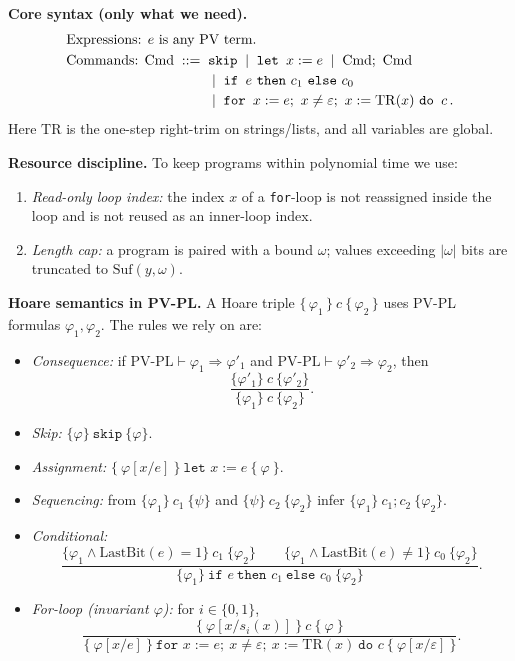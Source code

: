 \medskip
\noindent\textbf{Core syntax (only what we need).}
\[
\begin{array}{l}
\text{Expressions: } e \text{ is any PV term.} \\[0.3em]
\text{Commands: } \text{Cmd} \;::=\; \texttt{skip}
\;\mid\; \texttt{let } x := e
\;\mid\; \text{Cmd};\ \text{Cmd} \\[0.25em]
\hphantom{\text{Commands: } \text{Cmd} \;::=\;} 
\;\mid\; \texttt{if } e \ \texttt{then}\ c_1\ \texttt{else}\ c_0 \\[0.25em]
\hphantom{\text{Commands: } \text{Cmd} \;::=\;}
\;\mid\; \texttt{for } x := e;\ x \neq \varepsilon;\ x := \mathrm{TR}(x)\ \texttt{do } c\,.
\end{array}
\]
Here \( \mathrm{TR} \) is the one-step right-trim on strings/lists, and all variables are global.

\medskip
\noindent\textbf{Resource discipline.}
To keep programs within polynomial time we use:
\begin{enumerate}
  \item \emph{Read-only loop index:} the index \(x\) of a \texttt{for}-loop is not reassigned inside the loop and is not reused as an inner-loop index.
  \item \emph{Length cap:} a program is paired with a bound \(\omega\); values exceeding \(|\omega|\) bits are truncated to \(\mathrm{Suf}(y,\omega)\).
\end{enumerate}

\medskip
\noindent\textbf{Hoare semantics in PV-PL.}
A Hoare triple \(\{\,\varphi_1\,\}\ c\ \{\,\varphi_2\,\}\) uses PV-PL formulas \(\varphi_1,\varphi_2\). The rules we rely on are:

\begin{itemize}
  \item \emph{Consequence:} if \( \mathrm{PV\mbox{-}PL} \vdash \varphi_1 \Rightarrow \varphi'_1 \) and \( \mathrm{PV\mbox{-}PL} \vdash \varphi'_2 \Rightarrow \varphi_2 \), then
  \[
    \dfrac{\{\varphi'_1\}\ c\ \{\varphi'_2\}}{\{\varphi_1\}\ c\ \{\varphi_2\}}.
  \]
  \item \emph{Skip:} \(\{\varphi\}\ \texttt{skip}\ \{\varphi\}\).
  \item \emph{Assignment:} \(\{\ \varphi[x/e]\ \}\ \texttt{let }x := e\ \{\ \varphi\ \}\).
  \item \emph{Sequencing:} from \(\{\varphi_1\}\ c_1\ \{\psi\}\) and \(\{\psi\}\ c_2\ \{\varphi_2\}\) infer \(\{\varphi_1\}\ c_1;c_2\ \{\varphi_2\}\).
  \item \emph{Conditional:}
  \[
  \dfrac{\{\varphi_1 \land \mathrm{LastBit}(e)=1\}\ c_1\ \{\varphi_2\}
        \qquad
        \{\varphi_1 \land \mathrm{LastBit}(e)\neq 1\}\ c_0\ \{\varphi_2\}}
        {\{\varphi_1\}\ \texttt{if }e\ \texttt{then }c_1\ \texttt{else }c_0\ \{\varphi_2\}}.
  \]
  \item \emph{For-loop (invariant \(\varphi\)):} for \(i\in\{0,1\}\),
  \[
  \dfrac{\{\ \varphi[x/s_i(x)]\ \}\ c\ \{\ \varphi\ \}}
        {\{\ \varphi[x/e]\ \}\ \texttt{for }x := e;\ x\neq\varepsilon;\ x := \mathrm{TR}(x)\ \texttt{do } c\ \{\ \varphi[x/\varepsilon]\ \}}.
  \]
\end{itemize}

